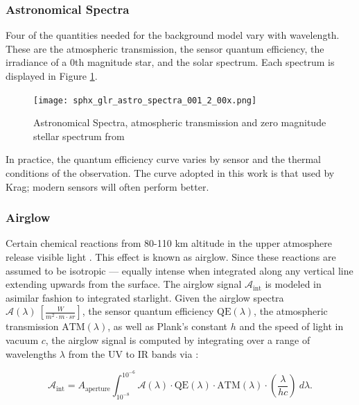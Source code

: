 \subsubsection{Astronomical Spectra}

Four of the quantities needed for the background model vary with wavelength. These are the atmospheric transmission, the sensor quantum efficiency, the irradiance of a 0th magnitude star, and the solar spectrum. Each spectrum is displayed in Figure \ref{fig:spectra}.

\begin{figure}[ht]
  \centering
  \texttt{[image: sphx\_glr\_astro\_spectra\_001\_2\_00x.png]}
  \caption{Astronomical Spectra, atmospheric transmission and zero magnitude stellar spectrum from \cite{krag2003}}
  \label{fig:spectra}
\end{figure}

In practice, the quantum efficiency curve varies by sensor and the thermal conditions of the
observation. The curve adopted in this work is that used by Krag; modern sensors will often
perform better.

\subsubsection{Airglow}

Certain chemical reactions from 80-110 km altitude in the upper atmosphere release visible light
\cite{krag2003}. This effect is known as
airglow. Since these reactions are assumed to be isotropic ---  equally intense when integrated along any
vertical line extending upwards from the surface. The airglow signal $\mathcal{A}_\mathrm{int}$ is modeled in asimilar fashion to integrated starlight. Given the airglow spectra $\mathcal{A}(\lambda) \: \left[ \frac{W}{m^2\cdot m \cdot sr} \right]$, the sensor quantum efficiency $\textrm{QE}(\lambda)$, the atmospheric transmission $\textrm{ATM}(\lambda)$, as well as Plank's constant $h$ and the speed of light in vacuum $c$, the airglow signal is computed by integrating over a range of wavelengths $\lambda$ from the UV to IR bands via \cite{krag2003}:

\begin{equation} \label{eq:aint}
 \mathcal{A}_\mathrm{int} = A_\mathrm{aperture}
  \int_{10^{-8}}^{10^{-6}}{ \mathcal{A}(\lambda) \cdot \textrm{QE}(\lambda) \cdot \textrm{ATM}(\lambda)
  \cdot \left( \frac{\lambda}{h c} \right) \: d\lambda}.
\end{equation}

